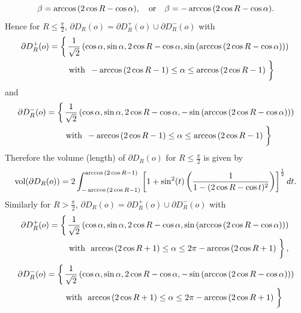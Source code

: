 \documentclass{amsart}
\theoremstyle{definition}
\theoremstyle{remark}
\begin{document}
$$
\beta=\arccos{\left(2\cos{R}-\cos{\alpha}\right)},\quad {\rm or}\quad \beta=-\arccos{\left(2\cos{R}-\cos{\alpha}\right)}. 
$$
Hence for $R\leq \frac{\pi}{2}$, $\partial D_R(o)=\partial D_R^+(o)\cup \partial D_R^-(o)$ with
$$
\begin{aligned}
\partial D^+_R(o)=\left\{\vphantom{\frac{1}{2}}\right.& \frac{1}{\sqrt{2}}\left(\cos{\alpha}, \sin{\alpha}, 2\cos{R}-\cos{\alpha}, \sin\left(\arccos{\left(2\cos{R}-\cos{\alpha}\right)}\right) \right)\,  \\&   \,  \text{with }\, -\arccos{\left(2\cos{R}-1\right)}\leq \alpha\leq \arccos{\left(2\cos{R}-1\right)}\left. \vphantom{\frac{1}{2}}\right\}
\end{aligned}
$$
and 
$$
\begin{aligned}
\partial D^-_R(o)=\left\{\vphantom{\frac{1}{2}}\right.& \frac{1}{\sqrt{2}}\left(\cos{\alpha}, \sin{\alpha}, 2\cos{R}-\cos{\alpha}, -\sin\left(\arccos{\left(2\cos{R}-\cos{\alpha}\right)}\right) \right) \\&   \,  \text{with }\, -\arccos{\left(2\cos{R}-1\right)}\leq \alpha\leq \arccos{\left(2\cos{R}-1\right)}\left. \vphantom{\frac{1}{2}}\right\}
\end{aligned}
$$
Therefore the volume (length) of $\partial D_R(o)$ for $R\leq \frac{\pi}{2}$ is given by
$$
{\rm vol}(\partial D_R(o))=2\int_{-\arccos{\left(2\cos{R}-1\right)}}^{\arccos{\left(2\cos{R}-1\right)}}\left[1+\sin^2(t)\left(\frac{1}{1-(2\cos{R}-\cos{t})^2}\right)\right]^{\frac{1}{2}}dt.
$$
Similarly for $R>\frac{\pi}{2}$, $\partial D_R(o)=\partial D_R^+(o)\cup \partial D_R^-(o)$ with
$$
\begin{aligned}
\partial D^+_R(o)=\left\{\vphantom{\frac{1}{2}}\right.& \frac{1}{\sqrt{2}}\left(\cos{\alpha}, \sin{\alpha}, 2\cos{R}-\cos{\alpha}, \sin\left(\arccos{\left(2\cos{R}-\cos{\alpha}\right)}\right) \right)\,  \\&   \,  \text{with }\, \arccos{\left(2\cos{R}+1\right)}\leq \alpha\leq 2\pi-\arccos{\left(2\cos{R}+1\right)}\left. \vphantom{\frac{1}{2}}\right\},
\end{aligned}
$$
$$
\begin{aligned}
\partial D^-_R(o)=\left\{\vphantom{\frac{1}{2}}\right.& \frac{1}{\sqrt{2}}\left(\cos{\alpha}, \sin{\alpha}, 2\cos{R}-\cos{\alpha}, -\sin\left(\arccos{\left(2\cos{R}-\cos{\alpha}\right)}\right) \right) \\&   \,  \text{with }\, \arccos{\left(2\cos{R}+1\right)}\leq \alpha\leq 2\pi-\arccos{\left(2\cos{R}+1\right)}\left. \vphantom{\frac{1}{2}}\right\}
\end{aligned}
$$
\end{document}
